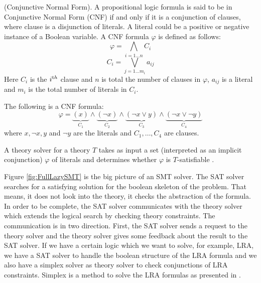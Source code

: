 \begin{definition}
\label{def:CNF}
    (Conjunctive Normal Form).
    A propositional logic formula is said to be in Conjunctive Normal Form (CNF) if and only if it is a conjunction of clauses, where clause is a disjunction of literals. A literal could be a positive or negative instance of a Boolean variable. A CNF formula $\varphi$ is defined as follows:
$$\varphi = \bigwedge\limits_{i=1\ldots n} C_{i}$$
$$ C_{i} = \bigvee\limits_{j=1\ldots m_{i}} a_{ij}$$
Here $C_{i}$ is the $i^{\text th}$ clause and $n$ is total the number of clauses in $\varphi$, $a_{ij}$ is a literal and $m_{i}$ is the total number of literals in $C_{i}$.\newline
\begin{example}
	The following is a CNF formula:
	$$\varphi=\underbrace{(x)}\limits_{C_{1}}\wedge\underbrace{(\neg x)}\limits_{C_2}\wedge\underbrace{(\neg x\vee y)}\limits_{C_{3}}\wedge\underbrace{(\neg x \vee \neg y)}\limits_{C_{4}}$$
	where $x, \neg x, y$ and $\neg y$ are the literals and $C_{1}, \ldots, C_{4}$ are clauses.
\end{example}
\end{definition}

\noindent A theory solver for a theory $T$ takes as input a set (interpreted as an implicit conjunction) $\varphi$ of literals and determines whether $\varphi$ is $T$-satisfiable \cite{barrett2018satisfiability}.\newline

\noindent Figure \ref{fig:FullLazySMT} is the big picture of an SMT solver.
The SAT solver searches for a satisfying solution for the boolean skeleton of the problem.
That means, it does not look into the theory, it checks the abstraction of the formula.
In order to be complete, the SAT solver communicates with the theory solver which extends the logical search by checking theory constraints.
The communication is in two direction.
First, the SAT solver sends a request to the theory solver and the theory solver gives some feedback about the result to the SAT solver.
If we have a certain logic which we want to solve, for example, LRA, we have a SAT solver to handle the boolean structure of the LRA formula and we also have a simplex solver as theory solver to check conjunctions of LRA constraints.
Simplex is a method to solve the LRA formulas as presented in \cite{10.1007/11817963_11}.


